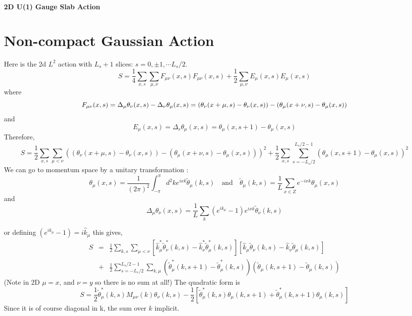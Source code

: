 \documentclass[12 pt]{article}
\newcommand{\nn}{\nonumber \\}
\newcommand\be{\begin{equation}}
\newcommand\ee{\end{equation}}
\newcommand\bea{\begin{eqnarray}}
\newcommand\eea{\end{eqnarray}}
\newcommand{\<}{\langle}
\renewcommand{\>}{\rangle}
\begin{document}
\begin{center}
 \Large \bf 2D U(1) Gauge Slab Action
\end{center}

\section{Non-compact Gaussian Action}

Here is the 2d $L^2$ action  with $L_s + 1$  slices: $s = 0, \pm 1, \cdots L_s/2$.
%
\be
S =  \frac{1}{4} \sum_{x,s}   \sum_{\mu,\nu} F_{\mu \nu}(x,s) F_{\mu
  \nu}(x,s)  + \frac{1}{2} \sum_{\mu,\nu} E_\mu(x,s) E_\mu(x,s)  
\ee
where 
\be
F_{\mu \nu}(x,s)  = \Delta_\mu \theta_\nu(x,s) - \Delta_\nu \theta_\mu(x,s) \nn
 = ( \theta_\nu(x +\mu,s) - \theta_\nu(x,s) ) - ( \theta_\mu(x +\nu,s) - \theta_\mu(x,s) )
\ee
and 
\be
E_\mu(x,s) = \Delta_s \theta_\mu(x,s) = \theta_\mu(x,s+1)  -\theta_\mu(x,s) 
\ee
Therefore,
\be
S =  \frac{1}{2} \sum_{x,s}  \sum_{\mu <\nu} ( ( \theta_\nu(x +\mu,s)
- \theta_\nu(x,s) ) - ( \theta_\mu(x +\nu,s) - \theta_\mu(x,s) ))^2
+ \frac{1}{2} \sum_{x,s} \sum^{L_s/2 -1}_{s= -L_s/2} (\theta_\mu(x,s+1)  -\theta_\mu(x,s) )^2
\ee
We can go to momentum space by a unitary transformation :
\be
\theta_\mu(x,s) =  \frac{1}{(2 \pi)^2}\int^\pi_{-\pi} d^2k   e^{i x k}\widetilde\theta_\mu(k,s) \quad 
\mbox{and} \quad  \widetilde \theta_\mu(k,s) = \frac{1}{L}\sum_{x \in Z}  e^{-i x k} \theta_\mu(x,s) 
\ee
and 
\be
\Delta_\mu \theta_\nu(x,s)
= \frac{1}{L}\sum_k(e^{ik_\mu} - 1)  e^{i x k} \widetilde
\theta_\nu(k,s) 
\ee

or defining $ (e^{ik_\mu} - 1) =  i \hat k_\mu $ this  gives,
\bea
S &=&  \frac{1}{2} \sum_{k,s}\sum_{\mu <\nu} [ \hat k^*_\mu  \widetilde \theta^*_\nu(k,s) -
\hat k^*_\nu   \widetilde \theta^*_\mu(k,s) ]  [ \hat k_\mu  \widetilde \theta_\nu(k,s) -
\hat k_\nu   \widetilde \theta_\mu(k,s) ]  \nn
&+& \frac{1}{2} \sum^{L_s/2 -1}_{s= -L_s/2}  \sum_{k,\mu} (\widetilde\theta^*_\mu(k,s+1) -\widetilde\theta^*_\mu(k,s))(\widetilde\theta_\mu(k,s+1)  -\widetilde\theta_\mu(k,s) )
\eea
(Note in 2D  $\mu = x$, and $\nu = y$ so there is no sum at all!) 
The quadratic form is 
\be
S = \frac{1}{2} \widetilde \theta^*_\mu(k,s)
M_{\mu\nu}(k)\theta_\nu(k,s)  - \frac{1}{2} [\widetilde
\theta^*_\mu(k,s) \theta_\mu(k,s+1) + \widetilde
\theta^*_\mu(k,s+1) \theta_\mu(k,s)]
\ee
Since it is of course diagonal in k, the sum over $k$ implicit. 
\end{document}
